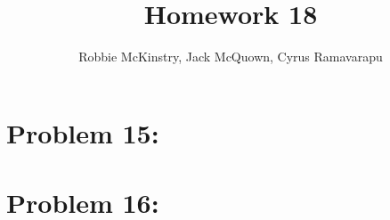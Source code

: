 \documentclass[12pt]{article}
\begin{document}
\title{Homework 18}
\author{Robbie McKinstry, Jack McQuown, Cyrus Ramavarapu}
\renewcommand{\today}{12 October 2016}
\renewcommand{\baselinestretch}{1.5}
\maketitle

\section*{Problem 15: }
\section*{Problem 16: }
\end{document}
